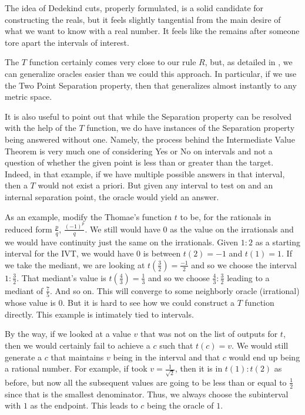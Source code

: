 \documentclass[12pt]{article}
\theoremstyle{remark}
\begin{document}
The idea of Dedekind cuts, properly formulated, is a solid candidate for constructing the reals, but it feels slightly tangential from the main desire of what we want to know with a real number. It feels like the remains after someone tore apart the intervals of interest. 

The $T$ function certainly comes very close to our rule $R$, but, as detailed in \cite{taylor23metric}, we can generalize oracles easier than we could this approach. In particular, if we use the Two Point Separation property, then that generalizes almost instantly to any metric space. 

It is also useful to point out that while the Separation property can be resolved with the help of the $T$ function, we do have instances of the Separation property being answered without one. Namely, the process behind the Intermediate Value Theorem is very much one of considering Yes or No on intervals and not a question of whether the given point is less than or greater than the target. Indeed, in that example, if we have multiple possible answers in that interval, then a $T$ would not exist a priori. But given any interval to test on and an internal separation point, the oracle would yield an answer. 

As an example, modify the Thomae's function $t$ to be, for the rationals in reduced form $\frac{p}{q}$, $\frac{(-1)^p}{q}$. We still would have $0$ as the value on the irrationals and we would have continuity just the same on the irrationals. Given $1:2$ as a starting interval for the IVT, we would have $0$ is between $t(2) = -1$ and $t(1) = 1$. If we take the mediant, we are looking at $t(\frac{3}{2}) = \frac{-1}{2}$ and so we choose the interval $1:\frac{3}{2}$. That mediant's value is $t(\frac{4}{3}) = \frac{1}{3}$ and so we choose $\frac{4}{3}:\frac{3}{2}$ leading to a mediant of $\frac{7}{5}$. And so on. This will converge to some neighborly oracle (irrational) whose value is $0$. But it is hard to see how we could construct a $T$ function directly. This example is intimately tied to intervals. 

By the way, if we looked at a value $v$ that was not on the list of outputs for $t$, then we would certainly fail to achieve a $c$ such that $t(c) = v$. We would still generate a $c$ that maintains $v$ being in the interval and that $c$ would end up being a rational number. For example, if took $v = \frac{1}{\sqrt{2}}$, then it is in $t(1):t(2)$ as before, but now all the subsequent values are going to be less than or equal to $\frac{1}{2}$ since that is the smallest denominator. Thus, we always choose the subinterval with $1$ as the endpoint. This leads to $c$ being the oracle of $1$. 
\end{document}
